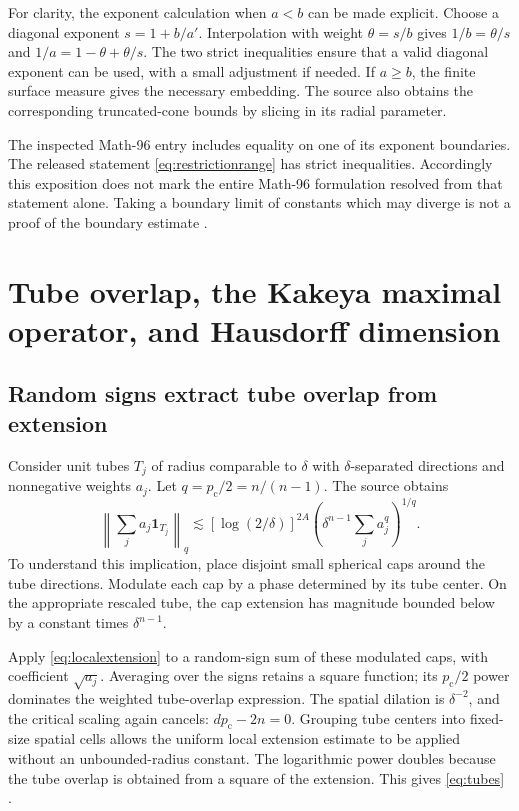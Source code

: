 \documentclass[11pt,a4paper]{article}
\numberwithin{equation}{section}
\theoremstyle{definition}
\theoremstyle{remark}
\newcommand{\pc}{p_{\mathrm c}}
\newcommand{\one}{\mathbf 1}
\begin{document}
For clarity, the exponent calculation when $a<b$ can be made explicit.
Choose a diagonal exponent $s=1+b/a'$. Interpolation with weight $\theta=s/b$
gives $1/b=\theta/s$ and $1/a=1-\theta+\theta/s$.
The two strict inequalities ensure that a valid diagonal exponent can be
used, with a small adjustment if needed. If $a\ge b$, the finite surface
measure gives the necessary embedding. The source also obtains the
corresponding truncated-cone bounds by slicing in its radial parameter.

The inspected Math-96 entry includes equality on one of its exponent boundaries.
The released statement \eqref{eq:restrictionrange} has strict inequalities.
Accordingly this exposition does not mark the entire Math-96 formulation
resolved from that statement alone. Taking a boundary limit of constants which
may diverge is not a proof of the boundary estimate \cite{restriction-catalogue}.

\section{Tube overlap, the Kakeya maximal operator, and Hausdorff dimension}
\label{sec:kakeya}
\subsection{Random signs extract tube overlap from extension}
Consider unit tubes $T_j$ of radius comparable to $\delta$ with
$\delta$-separated directions and nonnegative weights $a_j$.
Let $q=\pc/2=n/(n-1)$. The source obtains
\begin{equation}\label{eq:tubes}
 \left\|\sum_j a_j\one_{T_j}\right\|_q
 \lesssim[\log(2/\delta)]^{2A}
          \left(\delta^{n-1}\sum_j a_j^q\right)^{1/q}.
\end{equation}
To understand this implication, place disjoint small spherical caps around
the tube directions. Modulate each cap by a phase determined by its tube
center. On the appropriate rescaled tube, the cap extension has magnitude
bounded below by a constant times $\delta^{n-1}$.

Apply \eqref{eq:localextension} to a random-sign sum of these modulated caps,
with coefficient $\sqrt{a_j}$. Averaging over the signs retains a square
function; its $\pc/2$ power dominates the weighted tube-overlap expression.
The spatial dilation is $\delta^{-2}$, and the critical scaling again cancels:
$d\pc-2n=0$. Grouping tube centers into fixed-size spatial cells allows the
uniform local extension estimate to be applied without an unbounded-radius
constant. The logarithmic power doubles because the tube overlap is obtained
from a square of the extension. This gives \eqref{eq:tubes}
\cite{kakeya-proof}.
\end{document}
